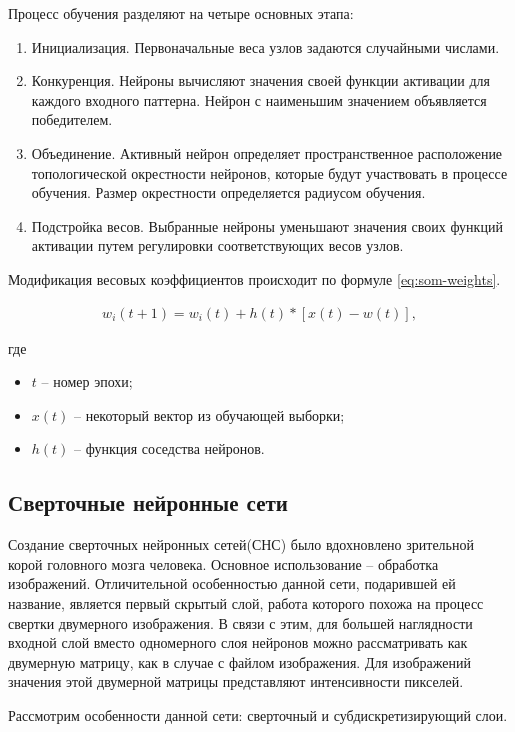 Процесс обучения разделяют на четыре основных этапа:

\begin{enumerate}
	\item Инициализация. Первоначальные веса узлов задаются случайными числами.
	\item Конкуренция. Нейроны вычисляют значения своей функции активации для каждого входного паттерна. Нейрон с наименьшим значением объявляется победителем.
	\item Объединение. Активный нейрон определяет пространственное расположение топологической окрестности нейронов, которые будут участвовать в процессе обучения. Размер окрестности определяется радиусом обучения.
	\item Подстройка весов. Выбранные нейроны уменьшают значения своих функций активации путем регулировки соответствующих весов узлов.
\end{enumerate}

Модификация весовых коэффициентов происходит по формуле \ref{eq:som-weights}.

\begin{eqnarray}\label{eq:som-weights}
w_i(t+1) = w_i(t) + h(t)*[x(t)-w(t)],
\end{eqnarray}

где
\begin{itemize}
	\item $t$ -- номер эпохи;
	\item $x(t)$ -- некоторый вектор из обучающей выборки;
	\item $h(t)$ -- функция соседства нейронов.
\end{itemize}

\subsection{Сверточные нейронные сети}

Создание сверточных нейронных сетей(СНС) было вдохновлено зрительной корой головного мозга человека\cite{Hubel}. Основное использование -- обработка изображений. Отличительной особенностью данной сети, подарившей ей название, является первый скрытый слой, работа которого похожа на процесс свертки двумерного изображения. В связи с этим, для большей наглядности входной слой вместо одномерного слоя нейронов можно рассматривать как двумерную матрицу, как в случае с файлом изображения. Для изображений значения этой двумерной матрицы представляют интенсивности пикселей. 

Рассмотрим особенности данной сети: сверточный и субдискретизирующий слои.

